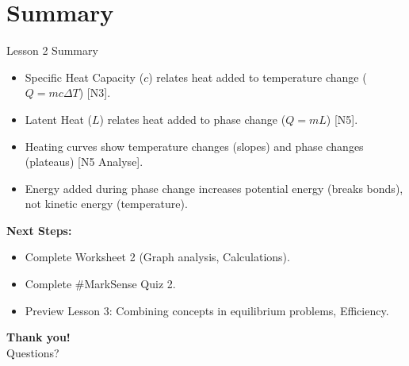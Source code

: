 \documentclass[xcolor=svgnames]{beamer}
\begin{document}
\section{Summary}
\begin{frame}{Lesson 2 Summary}
    \begin{itemize}
        \item Specific Heat Capacity ($c$) relates heat added to temperature change ($Q=mc\Delta T$) [N3].
        \item Latent Heat ($L$) relates heat added to phase change ($Q=mL$) [N5].
        \item Heating curves show temperature changes (slopes) and phase changes (plateaus) [N5 Analyse].
        \item Energy added during phase change increases potential energy (breaks bonds), not kinetic energy (temperature).
    \end{itemize}
    \vspace{1em}
    \textbf{Next Steps:}
    \begin{itemize}
        \item Complete Worksheet 2 (Graph analysis, Calculations).
        \item Complete \#MarkSense Quiz 2.
        \item Preview Lesson 3: Combining concepts in equilibrium problems, Efficiency.
    \end{itemize}
\end{frame}

\begin{frame}
    \centering
    \textbf{Thank you!}\\
    Questions?
\end{frame}
\end{document}

